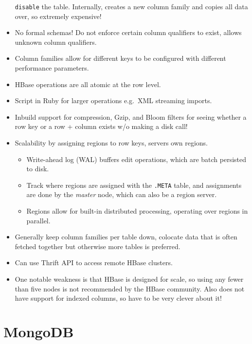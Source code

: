 \documentclass[10pt]{article}
\begin{document}
\begin{itemize}
        \lstinline{disable} the table. Internally, creates a new column family
        and copies all data over, so extremely expensive!
    \item No formal schemas! Do not enforce certain column qualifiers to exist,
        allows unknown column qualifiers.
    \item Column families allow for different keys to be configured with
        different performance parameters.
    \item HBase operations are all atomic at the row level.
    \item Script in Ruby for larger operations e.g.\ XML streaming imports.
    \item Inbuild support for compression, Gzip, and Bloom filters for seeing
        whether a row key or a row + column exists w/o making a disk call!
    \item Scalability by assigning regions to row keys, servers own regions.
        \begin{itemize}
            \item Write-ahead log (WAL) buffers edit operations, which are batch persisted
                to disk.
            \item Track where regions are assigned with the \lstinline{.META}
                table, and assignments are done by the \emph{master} node, which can
                also be a region server.
            \item Regions allow for built-in distributed processing, operating
                over regions in parallel.
        \end{itemize}
    \item Generally keep column families per table down, colocate data that is
        often fetched together but otherwise more tables is preferred.
    \item Can use Thrift API to access remote HBase clusters.
    \item One notable weakness is that HBase is designed for scale, so using any
        fewer than five nodes is not recommended by the HBase community. Also
        does not have support for indexed columns, so have to be very clever
        about it!
\end{itemize}

\section{MongoDB}
\end{document}
